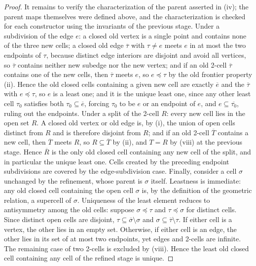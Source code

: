 \documentclass[11pt]{article}
\theoremstyle{mainplain}
\theoremstyle{mainroman}
\theoremstyle{definition}
\numberwithin{equation}{section}
\begin{document}
\begin{proof}
It remains to verify the characterization of the parent asserted in
(iv); the parent maps themselves were defined above, and the
characterization is checked for each constructor using the invariants
of the previous stage. Under a subdivision of the edge \(e\): a closed
old vertex is a single point and contains none of the three new cells;
a closed old edge \(\overline\tau\) with \(\tau\ne e\) meets \(e\) in
at most the two endpoints of \(\tau\), because distinct edge interiors
are disjoint and avoid all vertices, so \(\overline\tau\) contains
neither new subedge nor the new vertex; and if an old 2-cell
\(\overline\tau\) contains one of the new cells, then
\(\overline\tau\) meets \(e\), so \(e\preceq\tau\) by the old frontier
property (ii). Hence the old closed cells containing a given new cell
are exactly \(\overline e\) and the \(\overline\tau\) with
\(e\preceq\tau\), so \(e\) is a least one; and it is the unique least
one, since any other least cell \(\tau_0\) satisfies both
\(\tau_0\subseteq\overline e\), forcing \(\tau_0\) to be \(e\) or an
endpoint of \(e\), and \(e\subseteq\overline{\tau_0}\), ruling out the
endpoints. Under a split of the 2-cell \(R\): every new cell lies in
the open set \(R\). A closed old vertex or old edge is, by (i), the
union of open cells distinct from \(R\) and is therefore disjoint from
\(R\); and if an old 2-cell \(\overline T\) contains a new cell, then
\(\overline T\) meets \(R\), so \(R\subseteq\overline T\) by (ii), and
\(T=R\) by (viii) at the previous stage. Hence \(\overline R\) is the
only old closed cell containing any new cell of the split, and in
particular the unique least one. Cells created by the preceding
endpoint subdivisions are covered by the edge-subdivision case.
Finally, consider a cell \(\sigma\) unchanged by the refinement, whose
parent is \(\sigma\) itself. Leastness is immediate: any old closed
cell containing the open cell \(\sigma\) is, by the definition of the
geometric relation, a supercell of \(\sigma\). Uniqueness of the least
element reduces to antisymmetry among the old cells: suppose
\(\sigma\preceq\tau\) and \(\tau\preceq\sigma\) for distinct cells.
Since distinct open cells are disjoint,
\(\tau\subseteq\overline\sigma\setminus\sigma\) and
\(\sigma\subseteq\overline\tau\setminus\tau\). If either cell is a
vertex, the other lies in an empty set. Otherwise, if either cell is
an edge, the other lies in its set of at most two endpoints, yet edges
and 2-cells are infinite. The remaining case of two 2-cells is
excluded by (viii). Hence the least old closed cell containing any
cell of the refined stage is unique.


\end{proof}
\end{document}
